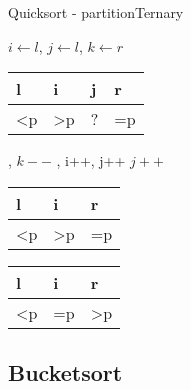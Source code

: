 \documentclass[18pt]{beamer}
\begin{document}
\begin{frame}[fragile]{Quicksort - partitionTernary}
\small
\begin{algorithmic}
  \State $i \gets l$, $j \gets l$, $k \gets r$
  \State \Comment \begin{tabular}{|l|l|l|l|}
	  \hline
	  l & i & j & r \\	  \hline
           \textless p & \textgreater  p & ? & =p \\
           \hline
         \end{tabular}
     , $k--$
     , i++, j++
    \Else \text{ } $j++$
    \EndIf
  \EndWhile
  \State \Comment \begin{tabular}{|l|l|l|}
	  \hline
	  l & i  & r \\	  \hline
           \textless p & \textgreater  p & =p \\
           \hline
         \end{tabular}
     
    \Else \text{ } 
    \EndIf
      \State \Comment \begin{tabular}{|l|l|l|}
	  \hline
	  l & i  & r \\	  \hline
           \textless p & =p & \textgreater  p \\
           \hline
         \end{tabular}
 \EndFunction
\end{algorithmic}

\end{frame}

\subsection{Bucketsort}
\end{document}
